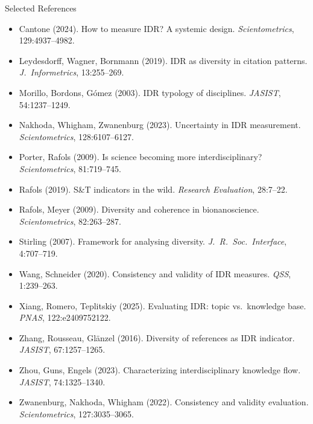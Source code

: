 \documentclass[aspectratio=169,10pt]{beamer}
\begin{document}
\begin{frame}[allowframebreaks]{Selected References}
\scriptsize
\begin{itemize}
  \item Cantone (2024). How to measure IDR? A systemic design.
        \emph{Scientometrics}, 129:4937--4982.
  \item Leydesdorff, Wagner, Bornmann (2019). IDR as diversity in
        citation patterns. \emph{J.\ Informetrics}, 13:255--269.
  \item Morillo, Bordons, G\'omez (2003). IDR typology of disciplines.
        \emph{JASIST}, 54:1237--1249.
  \item Nakhoda, Whigham, Zwanenburg (2023). Uncertainty in IDR
        measurement. \emph{Scientometrics}, 128:6107--6127.
  \item Porter, Rafols (2009). Is science becoming more interdisciplinary?
        \emph{Scientometrics}, 81:719--745.
  \item Rafols (2019). S\&T indicators in the wild.
        \emph{Research Evaluation}, 28:7--22.
  \item Rafols, Meyer (2009). Diversity and coherence in bionanoscience.
        \emph{Scientometrics}, 82:263--287.
  \item Stirling (2007). Framework for analysing diversity.
        \emph{J.\ R.\ Soc.\ Interface}, 4:707--719.
  \item Wang, Schneider (2020). Consistency and validity of IDR measures.
        \emph{QSS}, 1:239--263.
  \item Xiang, Romero, Teplitskiy (2025). Evaluating IDR: topic vs.\
        knowledge base. \emph{PNAS}, 122:e2409752122.
  \item Zhang, Rousseau, Gl\"anzel (2016). Diversity of references
        as IDR indicator. \emph{JASIST}, 67:1257--1265.
  \item Zhou, Guns, Engels (2023). Characterizing interdisciplinary
        knowledge flow. \emph{JASIST}, 74:1325--1340.
  \item Zwanenburg, Nakhoda, Whigham (2022). Consistency and validity
        evaluation. \emph{Scientometrics}, 127:3035--3065.
\end{itemize}
\end{frame}
\end{document}
